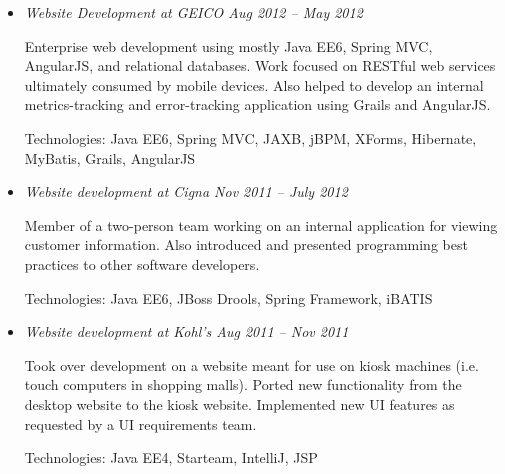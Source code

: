 \documentclass[a4paper,11pt]{article}
\begin{document}
  \vskip 5pt
  \begin{itemize}

    \item \textit{Website Development at GEICO \hfill Aug 2012 -- May 2012}

      Enterprise web development using mostly Java EE6, Spring MVC, AngularJS,
      and relational databases. Work focused on RESTful web services ultimately
      consumed by mobile devices. Also helped to develop an internal
      metrics-tracking and error-tracking application using Grails and
      AngularJS.

      Technologies: Java EE6, Spring MVC, JAXB, jBPM, XForms, Hibernate,
      MyBatis, Grails, AngularJS

%

    \item \textit{Website development at Cigna \hfill Nov 2011 -- July 2012}

      Member of a two-person team working on an internal application for viewing
      customer information. Also introduced and presented programming best
      practices to other software developers.

      Technologies: Java EE6, JBoss Drools, Spring Framework, iBATIS

    \item \textit{Website development at Kohl's \hfill Aug 2011 -- Nov 2011}

      Took over development on a website meant for use on kiosk machines
      (i.e. touch computers in shopping malls). Ported new functionality from
      the desktop website to the kiosk website. Implemented new UI features as
      requested by a UI requirements team.

      Technologies: Java EE4, Starteam, IntelliJ, JSP

  \end{itemize}
\end{document}
